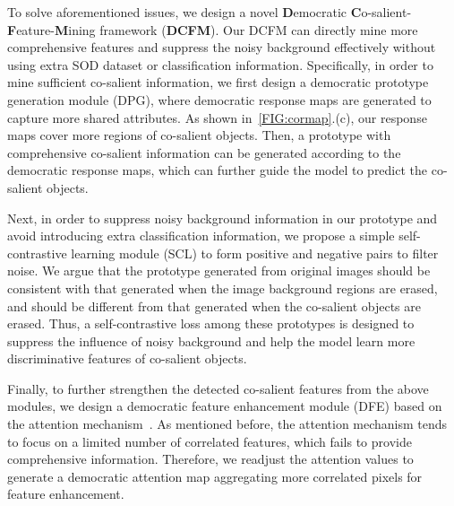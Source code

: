 \documentclass[10pt,twocolumn,letterpaper]{article}
\begin{document}
To solve aforementioned issues, we design a novel \textbf{D}emocratic \textbf{C}o-salient-\textbf{F}eature-\textbf{M}ining framework (\textbf{DCFM}). Our DCFM can directly mine more comprehensive features and suppress the noisy background effectively without using extra SOD dataset or classification information. Specifically, in order to mine sufficient co-salient information, we first design a democratic prototype generation module (DPG), where democratic response maps are generated to capture more shared attributes. As shown in~\cref{FIG:cormap}.(c), our response maps cover more regions of co-salient objects. Then, a prototype with comprehensive co-salient information can be generated according to the democratic response maps, which can further guide the model to predict the co-salient objects.

Next, in order to suppress noisy background information in our prototype and avoid introducing extra classification information, we propose a simple self-contrastive learning module (SCL) to form positive and negative pairs to filter noise. We argue that the prototype generated from original images should be consistent with that generated when the image background regions are erased, and should be different from that generated when the co-salient objects are erased. Thus, a self-contrastive loss among these prototypes is designed to suppress the influence of noisy background and help the model learn more discriminative features of co-salient objects. 

Finally, to further strengthen the detected co-salient features from the above modules, we design a democratic feature enhancement module (DFE) based on the attention mechanism~\cite{vaswani2017attention}. As mentioned before, the attention mechanism tends to focus on a limited number of correlated features, which fails to provide comprehensive information. Therefore, we readjust the attention values to generate a  democratic attention map aggregating more correlated pixels for feature enhancement. 
\end{document}
